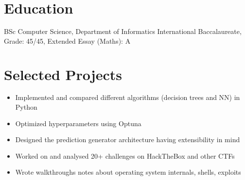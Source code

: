 \documentclass{resume}
\begin{document}



\section{Education}
BSc Computer Science, Department of Informatics
International Baccalaureate, Grade: 45/45, Extended Essay (Maths): A


\section{Selected Projects}
\begin{itemize}
  \item Implemented and compared different algorithms (decision trees and NN) in Python
  \item Optimized hyperparameters using Optuna
  \item Designed the prediction generator architecture having extensibility in mind
\end{itemize}

\begin{itemize}
  \item Worked on and analysed 20+ challenges on HackTheBox and other CTFs
  \item Wrote walkthroughs notes about operating system internals, shells, exploits
\end{itemize}
\end{document}
